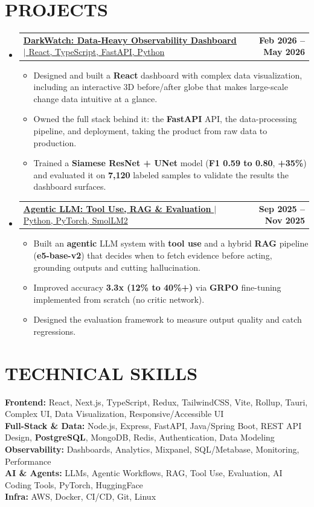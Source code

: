 \documentclass[letterpaper,11pt]{article}
\makeatletter
\newcommand{\resumeItem}[1]{\item\small{{#1 \vspace{-3pt}}}}
\newcommand{\resumeProjectHeading}[2]{\item\begin{tabular*}{1.001\textwidth}{l@{\extracolsep{\fill}}r}\small#1 & \textbf{\small #2}\\ \end{tabular*}\vspace{-7pt}}
\newcommand{\resumeSubHeadingListStart}{\begin{itemize}[leftmargin=0.0in, label={}]}
\newcommand{\resumeSubHeadingListEnd}{\end{itemize}}
\newcommand{\resumeItemListStart}{\begin{itemize}}
\newcommand{\resumeItemListEnd}{\end{itemize}\vspace{-6pt}}
\makeatother
\begin{document}
\section{PROJECTS}
    \resumeSubHeadingListStart
        \resumeProjectHeading
        {\href{https://github.com/Sashi445/dark-watch}{\textbf{\large{\underline{DarkWatch: Data-Heavy Observability Dashboard}}} $|$ \small{React, TypeScript, FastAPI, Python}}}{Feb 2026 -- May 2026}
        \resumeItemListStart
            \resumeItem{Designed and built a \textbf{React} dashboard with complex data visualization, including an interactive 3D before/after globe that makes large-scale change data intuitive at a glance.}
            \resumeItem{Owned the full stack behind it: the \textbf{FastAPI} API, the data-processing pipeline, and deployment, taking the product from raw data to production.}
            \resumeItem{Trained a \textbf{Siamese ResNet + UNet} model (\textbf{F1 0.59 to 0.80}, \textbf{+35\%}) and evaluated it on \textbf{7,120} labeled samples to validate the results the dashboard surfaces.}
        \resumeItemListEnd
        \vspace{-13pt}
        \resumeProjectHeading
        {\href{https://github.com/Sashi445/search-r1-implementation-RL}{\textbf{\large{\underline{Agentic LLM: Tool Use, RAG \& Evaluation}}} $|$ \small{Python, PyTorch, SmolLM2}}}{Sep 2025 -- Nov 2025}
        \resumeItemListStart
            \resumeItem{Built an \textbf{agentic} LLM system with \textbf{tool use} and a hybrid \textbf{RAG} pipeline (\textbf{e5-base-v2}) that decides when to fetch evidence before acting, grounding outputs and cutting hallucination.}
            \resumeItem{Improved accuracy \textbf{3.3x (12\% to 40\%+)} via \textbf{GRPO} fine-tuning implemented from scratch (no critic network).}
            \resumeItem{Designed the evaluation framework to measure output quality and catch regressions.}
        \resumeItemListEnd
    \resumeSubHeadingListEnd
\vspace{-5pt}
\section{TECHNICAL SKILLS}
\begin{itemize}[leftmargin=0.15in, label={}]
  \small{\item{
    \textbf{Frontend:}{ React, Next.js, TypeScript, Redux, TailwindCSS, Vite, Rollup, Tauri, Complex UI, Data Visualization, Responsive/Accessible UI} \\
    \textbf{Full-Stack \& Data:}{ Node.js, Express, FastAPI, Java/Spring Boot, REST API Design, \textbf{PostgreSQL}, MongoDB, Redis, Authentication, Data Modeling} \\
    \textbf{Observability:}{ Dashboards, Analytics, Mixpanel, SQL/Metabase, Monitoring, Performance} \\
    \textbf{AI \& Agents:}{ LLMs, Agentic Workflows, RAG, Tool Use, Evaluation, AI Coding Tools, PyTorch, HuggingFace} \\
    \textbf{Infra:}{ AWS, Docker, CI/CD, Git, Linux} \\
  }}
\end{itemize}
\end{document}
